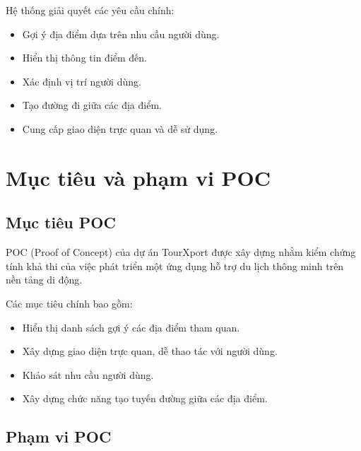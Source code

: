 \quad Hệ thống giải quyết các yêu cầu chính:
\begin{itemize}
    \item Gợi ý địa điểm dựa trên nhu cầu người dùng.
    \item Hiển thị thông tin điểm đến.
    \item Xác định vị trí người dùng.
    \item Tạo đường đi giữa các địa điểm.
    \item Cung cấp giao diện trực quan và dễ sử dụng.
\end{itemize}

\section{Mục tiêu và phạm vi POC}

\subsection{Mục tiêu POC}

\quad POC (Proof of Concept) của dự án TourXport được xây dựng nhằm kiểm chứng tính khả thi của việc phát triển một ứng dụng hỗ trợ du lịch thông minh trên nền tảng di động.

\quad Các mục tiêu chính bao gồm:
\begin{itemize}
    \item Hiển thị danh sách gợi ý các địa điểm tham quan.
    \item Xây dựng giao diện trực quan, dễ thao tác với người dùng.
    \item Khảo sát nhu cầu người dùng.
    \item Xây dựng chức năng tạo tuyến đường giữa các địa điểm.
\end{itemize}

\subsection{Phạm vi POC}

